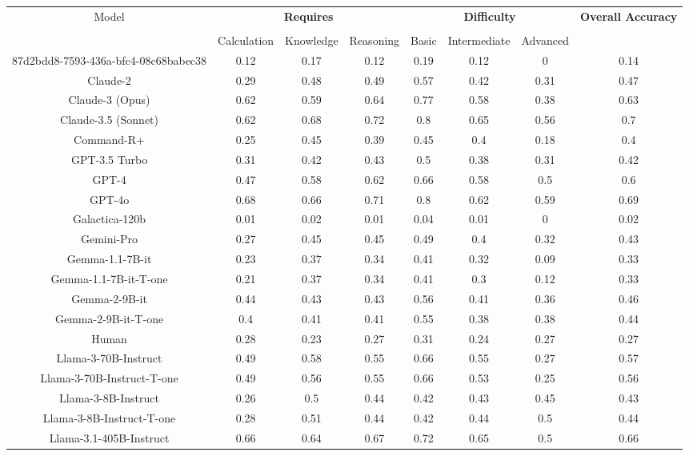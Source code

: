 \begin{tabular}{cccccccc}
\toprule
\multirow{3}{*}{Model} & \multicolumn{3}{c}{\textbf{Requires}} & \multicolumn{3}{c}{\textbf{Difficulty}} & \multirow{3}{*}{\textbf{Overall Accuracy}}\\\cmidrule(lr){2-4} \cmidrule(lr){5-7}\\
 & Calculation & Knowledge & Reasoning & Basic & Intermediate & Advanced &  \\
\midrule
87d2bdd8-7593-436a-bfc4-08c68babec38 & 0.12 & 0.17 & 0.12 & 0.19 & 0.12 & 0 & 0.14 \\
Claude-2 & 0.29 & 0.48 & 0.49 & 0.57 & 0.42 & 0.31 & 0.47 \\
Claude-3 (Opus) & 0.62 & 0.59 & 0.64 & 0.77 & 0.58 & 0.38 & 0.63 \\
Claude-3.5 (Sonnet) & 0.62 & 0.68 & 0.72 & 0.8 & 0.65 & 0.56 & 0.7 \\
Command-R+ & 0.25 & 0.45 & 0.39 & 0.45 & 0.4 & 0.18 & 0.4 \\
GPT-3.5 Turbo & 0.31 & 0.42 & 0.43 & 0.5 & 0.38 & 0.31 & 0.42 \\
GPT-4 & 0.47 & 0.58 & 0.62 & 0.66 & 0.58 & 0.5 & 0.6 \\
GPT-4o & 0.68 & 0.66 & 0.71 & 0.8 & 0.62 & 0.59 & 0.69 \\
Galactica-120b & 0.01 & 0.02 & 0.01 & 0.04 & 0.01 & 0 & 0.02 \\
Gemini-Pro & 0.27 & 0.45 & 0.45 & 0.49 & 0.4 & 0.32 & 0.43 \\
Gemma-1.1-7B-it & 0.23 & 0.37 & 0.34 & 0.41 & 0.32 & 0.09 & 0.33 \\
Gemma-1.1-7B-it-T-one & 0.21 & 0.37 & 0.34 & 0.41 & 0.3 & 0.12 & 0.33 \\
Gemma-2-9B-it & 0.44 & 0.43 & 0.43 & 0.56 & 0.41 & 0.36 & 0.46 \\
Gemma-2-9B-it-T-one & 0.4 & 0.41 & 0.41 & 0.55 & 0.38 & 0.38 & 0.44 \\
Human & 0.28 & 0.23 & 0.27 & 0.31 & 0.24 & 0.27 & 0.27 \\
Llama-3-70B-Instruct & 0.49 & 0.58 & 0.55 & 0.66 & 0.55 & 0.27 & 0.57 \\
Llama-3-70B-Instruct-T-one & 0.49 & 0.56 & 0.55 & 0.66 & 0.53 & 0.25 & 0.56 \\
Llama-3-8B-Instruct & 0.26 & 0.5 & 0.44 & 0.42 & 0.43 & 0.45 & 0.43 \\
Llama-3-8B-Instruct-T-one & 0.28 & 0.51 & 0.44 & 0.42 & 0.44 & 0.5 & 0.44 \\
Llama-3.1-405B-Instruct & 0.66 & 0.64 & 0.67 & 0.72 & 0.65 & 0.5 & 0.66 \\

\end{tabular}
